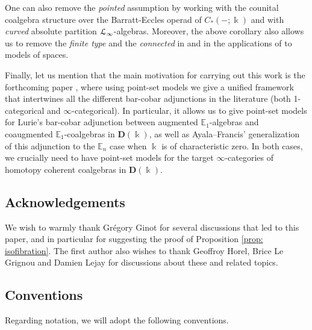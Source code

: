 \documentclass[a4paper,12pt]{amsart}
\renewcommand{\mathcal}{\EuScript}
\theoremstyle{plain}
\theoremstyle{definition}
\theoremstyle{remark}
\newcommand{\kk}{\Bbbk}
\begin{document}
One can also remove the \textit{pointed} assumption by working with the counital coalgebra structure over the Barratt-Eccles operad of $C_*(-;\kk)$ and with \textit{curved} absolute partition $\mathcal{L}_\infty$-algebras. Moreover, the above corollary also allows us to remove the \textit{finite type} and the \textit{connected} in \cite[Theorem E]{lucio2024higherlietheorypositive} and in the applications of \cite[Theorem B]{lucio2024higherlietheorypositive} to models of spaces.

Finally, let us mention that the main motivation for carrying out this work is the forthcoming paper \cite{poinsetkoszul}, where using point-set models we give a unified framework that intertwines all the different bar-cobar adjunctions in the literature (both 1-categorical and $\infty$-categorical). In particular, it allows us to give point-set models for Lurie's bar-cobar adjunction between augmented $\mathbb{E}_1$-algebras and coaugmented $\mathbb{E}_1$-coalgebras in $\mathbf{D}(\kk)$, as well as Ayala--Francis' generalization of this adjunction to the $\mathbb{E}_n$ case when $\kk$ is of characteristic zero. In both cases, we crucially need to have point-set models for the target $\infty$-categories of homotopy coherent coalgebras in $\mathbf{D}(\kk)$. 

\subsection*{Acknowledgements} We wish to warmly thank Grégory Ginot for several discussions that led to this paper, and in particular for suggesting the proof of Proposition \ref{prop: isofibration}. The first author also wishes to thank Geoffroy Horel, Brice Le Grignou and Damien Lejay for discussions about these and related topics. 


\subsection*{Conventions}
Regarding notation, we will adopt the following conventions. 

\end{document}
